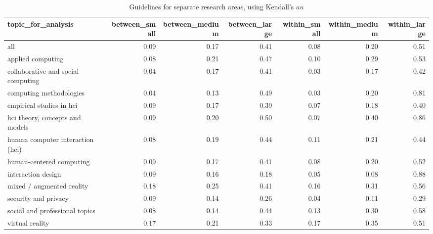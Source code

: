 \begin{table}[ht]
\centering
\begin{tabular}{lrrrrrr}
  \hline
topic\_for\_analysis & between\_small & between\_medium & between\_large & within\_small & within\_medium & within\_large \\ 
  \hline
all & 0.09 & 0.17 & 0.41 & 0.08 & 0.20 & 0.51 \\ 
  applied computing & 0.08 & 0.21 & 0.47 & 0.10 & 0.29 & 0.53 \\ 
  collaborative and social computing & 0.04 & 0.17 & 0.41 & 0.03 & 0.17 & 0.42 \\ 
  computing methodologies & 0.04 & 0.13 & 0.49 & 0.03 & 0.20 & 0.81 \\ 
  empirical studies in hci & 0.09 & 0.17 & 0.39 & 0.07 & 0.18 & 0.40 \\ 
  hci theory, concepts and models & 0.09 & 0.20 & 0.50 & 0.07 & 0.40 & 0.86 \\ 
  human computer interaction (hci) & 0.08 & 0.19 & 0.44 & 0.11 & 0.21 & 0.44 \\ 
  human-centered computing & 0.09 & 0.17 & 0.41 & 0.08 & 0.20 & 0.52 \\ 
  interaction design & 0.09 & 0.16 & 0.18 & 0.05 & 0.08 & 0.88 \\ 
  mixed / augmented reality & 0.18 & 0.25 & 0.41 & 0.16 & 0.31 & 0.56 \\ 
  security and privacy & 0.09 & 0.14 & 0.26 & 0.04 & 0.11 & 0.29 \\ 
  social and professional topics & 0.08 & 0.14 & 0.44 & 0.13 & 0.30 & 0.58 \\ 
  virtual reality & 0.17 & 0.21 & 0.33 & 0.17 & 0.35 & 0.51 \\ 
   \hline
\end{tabular}
\caption{Guidelines for separate research areas, using Kendall's $	au$} 
\label{tab:es guidelines kendallstau-es different topics}
\end{table}

